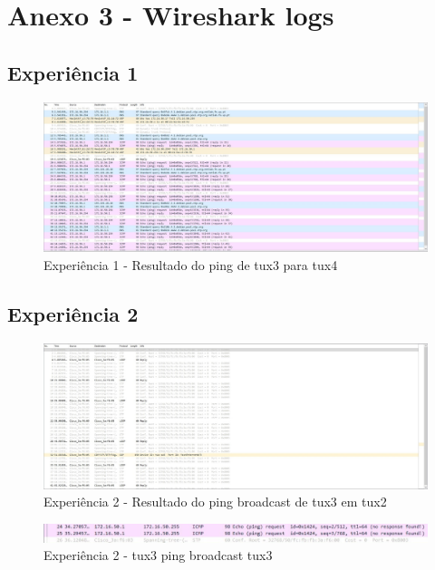 \section{Anexo 3 - Wireshark logs}

\subsection{Experiência 1}

\begin{figure}[H]
\centering
  \includegraphics[width=\linewidth]{img/exp1.jpg}
  \caption{Experiência 1 - Resultado do ping de tux3 para tux4}
\end{figure}


\subsection{Experiência 2}

\begin{figure}[H]
\centering
  \includegraphics[width=\linewidth]{img/exp2-tsk8-tux2-full.jpg}
  \caption{Experiência 2 - Resultado do ping broadcast de tux3 em tux2}
\end{figure}

\begin{figure}[H]
\centering
  \includegraphics[width=\linewidth]{img/exp2-tsk8-tux3.jpg}
  \caption{Experiência 2 - tux3 ping broadcast tux3}
\end{figure}

